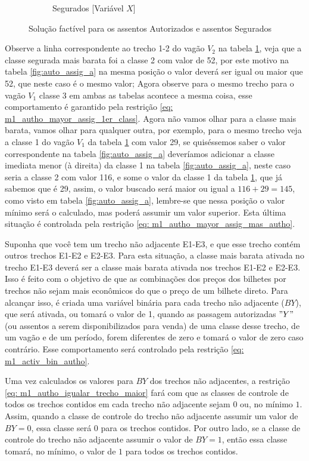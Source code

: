 \begin{figure}[h!]
\begin{subfigure}[b]{0.35\linewidth}
		\caption{Segurados [Variável $X$]}
		\label{fig:auto_assig_b}
	\end{subfigure}
	\caption{Solução factível para os assentos Autorizados e assentos Segurados}
	\label{fig:auto_assig}
\end{figure}

Observe a linha correspondente ao trecho 1-2 do vagão $V_2$ na tabela \ref{fig:auto_assig_b}, veja que a classe segurada mais barata foi a classe 2 com valor de 52, por este motivo na tabela \ref{fig:auto_assig_a} na mesma posição o valor deverá ser igual ou maior que 52, que neste caso é o mesmo valor; Agora observe para o mesmo trecho para o vagão $V_1$ classe 3 em ambas as tabelas acontece a mesma coisa, esse comportamento é garantido pela restrição \ref{eq: m1_autho_mayor_assig_1er_class}. Agora não vamos olhar para a classe mais barata, vamos olhar para qualquer outra, por exemplo, para o mesmo trecho veja a classe 1 do vagão $V_1$ da tabela \ref{fig:auto_assig_b} com valor 29, se quiséssemos saber o valor correspondente na tabela \ref{fig:auto_assig_a} deveríamos adicionar a classe imediata menor (à direita) da classe 1 na tabela \ref{fig:auto_assig_a}, neste caso seria a classe 2 com valor 116, e some o valor da classe 1 da tabela \ref{fig:auto_assig_b}, que já sabemos que é 29, assim, o valor buscado será maior ou igual a $116+29 = 145$, como visto em tabela \ref{fig:auto_assig_a}, lembre-se que nessa posição o valor mínimo será o calculado, mas poderá assumir um valor superior. Esta última situação é controlada pela restrição \ref{eq: m1_autho_mayor_assig_mas_autho}.

Suponha que você tem um trecho não adjacente E1-E3, e que esse trecho contém outros trechos E1-E2 e E2-E3. Para esta situação, a classe mais barata ativada no trecho E1-E3 deverá ser a classe mais barata ativada nos trechos E1-E2 e E2-E3. Isso é feito com o objetivo de que as combinações dos preços dos bilhetes por trechos não sejam mais econômicos do que o preço de um bilhete direto. Para alcançar isso, é criada uma variável binária para cada trecho não adjacente ($BY$), que será ativada, ou tomará o valor de 1, quando as passagem autorizadas $"Y"$ (ou assentos a serem disponibilizados para venda) de uma classe desse trecho, de um vagão e de um período, forem diferentes de zero e tomará o valor de zero caso contrário. Esse comportamento será controlado pela restrição \ref{eq: m1_activ_bin_autho}.

Uma vez calculados os valores para $BY$ dos trechos não adjacentes, a restrição \ref{eq: m1_autho_igualar_trecho_maior} fará com que as classes de controle de todos os trechos contidos em cada trecho não adjacente sejam $0$ ou, no mínimo $1$. Assim, quando a classe de controle do trecho não adjacente assumir um valor de $BY = 0$, essa classe será $0$ para os trechos contidos. Por outro lado, se a classe de controle do trecho não adjacente assumir o valor de $BY = 1$, então essa classe tomará, no mínimo, o valor de $1$ para todos os trechos contidos.

